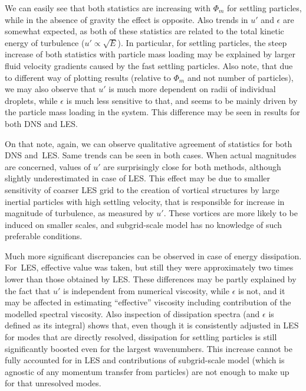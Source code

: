 \documentclass{pracamgren}
\begin{document}
We can easily see that both statistics are increasing with $\Phi_m$ for settling particles, while in the absence of gravity the effect is opposite.
Also trends in $u'$ and $\epsilon$ are somewhat expected, as both of these statistics are related to the total kinetic energy of turbulence ($u' \propto \sqrt{E}$).
In particular, for settling particles, the steep increase of both statistics with particle mass loading may be explained by larger fluid velocity gradients caused by the fast settling particles.
Also note, that due to different way of plotting results (relative to $\Phi_m$ and not number of particles), we may also observe that $u'$ is much more dependent on radii of individual droplets, while $\epsilon$ is much less sensitive to that, and seems to be mainly driven by the particle mass loading in the system.
This difference may be seen in results for both DNS and LES.

On that note, again, we can observe qualitative agreement of statistics for both DNS and~LES.
Same trends can be seen in both cases.
When actual magnitudes are concerned, values of $u'$ are surprisingly close for both methods, although slightly underestimated in case of LES.
This effect may be due to smaller sensitivity of coarser LES grid to the creation of vortical structures by large inertial particles with high settling velocity, that is responsible for increase in magnitude of turbulence, as measured by $u'$.
These vortices are more likely to be induced on smaller scales, and subgrid-scale model has no knowledge of such preferable conditions. 
 
Much more significant discrepancies can be observed in case of energy dissipation.
For~LES, effective value was taken, but still they were approximately two times lower than those obtained by LES.
These differences may be partly explained by the fact that $u'$ is independent from numerical viscosity, while $\epsilon$ is not, and it may be affected in estimating ``effective'' viscosity including contribution of the modelled spectral viscosity.
Also inspection of dissipation spectra (and $\epsilon$ is defined as its integral) shows that, even though it is consistently adjusted in LES for modes that are directly resolved, 
dissipation for settling particles is still significantly boosted even for the largest wavenumbers.
This increase cannot be fully accounted for in LES and contributions of subgrid-scale model (which is agnostic of any momentum transfer from particles) are not enough to make up for that unresolved modes.
\end{document}
